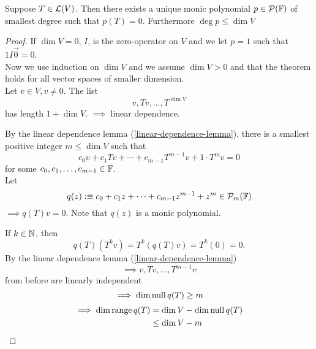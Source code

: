 \begin{thm}
  \label{unique-monic-polynomial-of-smallest-degree}
  Suppose $T\in \mathcal{L}(V)$. Then there exists a unique monic polynomial $p\in \mathcal{P}(\mathbb{F})$ of smallest degree such that $p(T)=0$. Furthermore $\deg p \leq \dim V$
\end{thm}
\begin{proof}
  If $\dim V=0$, $I$, is the zero-operator on $V$ and we let $p=1$ such that $1I\vec0=0$. \\
  Now we use induction on $\dim V$ and we assume $\dim V > 0$ and that the theorem holds for all vector spaces of smaller dimension. \\
  Let $v\in V, v \neq 0$. The list \begin{equation}
    v, Tv, \dots, T^{\dim V}
  \end{equation}
  has length $1+\dim V.$
  $\implies$ linear dependence.

  By the linear dependence lemma (\ref{linear-dependence-lemma}), there is a smallest positive integer $m\leq \dim V$ such that
  \begin{equation}
    c_0 v + c_1 Tv + \cdots + c_{m-1} T^{m-1} v + 1\cdot T^m v = 0
  \end{equation}
  for some $c_0, c_1, \dots, c_{m-1} \in \mathbb{F}$. \\

  Let
  \[ q(z) :\equiv c_0 + c_1z + \cdots + c_{m-1} z^{m-1} +z^{m} \in \mathcal{P}_m (\mathbb{F}) \]
  $\implies q(T) v=0$. Note that $q(z)$ is a monic polynomial.

  If $k \in \mathbb{N}$, then
  \begin{equation}
    q(T)(T^kv)=T^k(q(T)v) =T^k (0) =0.
  \end{equation}
  By the linear dependence lemma (\ref{linear-dependence-lemma}) \begin{equation}
    \implies v, Tv, \dots, T^{m-1}v
  \end{equation}
  from before are linearly independent \begin{equation}
    \implies \dim \operatorname{null} q(T) \geq m
  \end{equation}
  \begin{equation}
    \begin{aligned}
    \implies
    \dim \operatorname{range} q(T)
      &= \dim V - \dim \operatorname{null} q(T) \\
      &\leq \dim V - m
    \end{aligned}
  \end{equation}



\end{proof}
